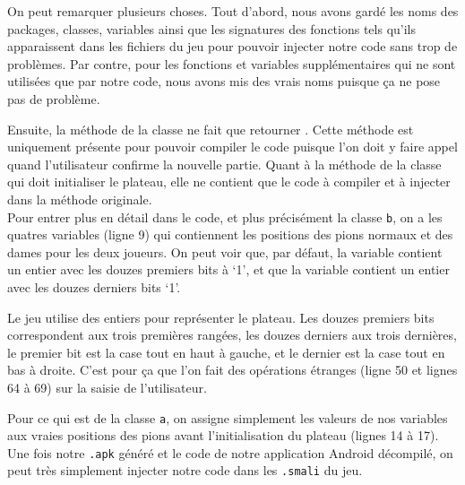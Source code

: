 On peut remarquer plusieurs choses. Tout d'abord, nous avons gardé les noms des packages, classes, variables ainsi que les signatures des fonctions tels qu'ils apparaissent dans les fichiers  du jeu pour pouvoir injecter notre code sans trop de problèmes. Par contre, pour les fonctions et variables supplémentaires qui ne sont utilisées que par notre code, nous avons mis des vrais noms puisque ça ne pose pas de problème.

Ensuite, la méthode  de la classe  ne fait que retourner . Cette méthode est uniquement présente pour pouvoir compiler le code puisque l'on doit y faire appel quand l'utilisateur confirme la nouvelle partie. Quant à la méthode  de la classe  qui doit initialiser le plateau, elle ne contient que le code à compiler et à injecter dans la méthode originale.\\

Pour entrer plus en détail dans le code, et plus précisément la classe \texttt{b}, on a les quatres variables  (ligne 9) qui contiennent les positions des pions normaux et des dames pour les deux joueurs. On peut voir que, par défaut, la variable  contient un entier avec les douzes premiers bits à `1', et que la variable  contient un entier avec les douzes derniers bits `1'.

Le jeu utilise des entiers pour représenter le plateau. Les douzes premiers bits correspondent aux trois premières rangées, les douzes derniers aux trois dernières, le premier bit est la case tout en haut à gauche, et le dernier est la case tout en bas à droite. C'est pour ça que l'on fait des opérations étranges (ligne 50 et lignes 64 à 69) sur la saisie de l'utilisateur.

Pour ce qui est de la classe \texttt{a}, on assigne simplement les valeurs de nos variables aux vraies positions des pions avant l'initialisation du plateau (lignes 14 à 17).\\

Une fois notre \texttt{.apk} généré et le code de notre application Android décompilé, on peut très simplement injecter notre code dans les \texttt{.smali} du jeu.\\

